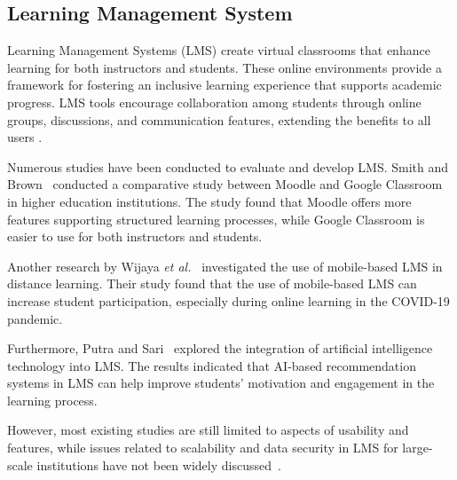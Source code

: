 \subsection{Learning Management System} Learning Management Systems (LMS) create virtual classrooms that enhance learning for both instructors and students.  These online environments provide a framework for fostering an inclusive learning experience that supports academic progress. LMS tools encourage collaboration among students through online groups, discussions, and communication features, extending the benefits to all users \cite{bradley2021learninglms}. 

Numerous studies have been conducted to evaluate and develop LMS. Smith and Brown~\cite{smith2020} conducted a comparative study between Moodle and Google Classroom in higher education institutions. The study found that Moodle offers more features supporting structured learning processes, while Google Classroom is easier to use for both instructors and students.

Another research by Wijaya \textit{et al.}~\cite{wijaya2021} investigated the use of mobile-based LMS in distance learning. Their study found that the use of mobile-based LMS can increase student participation, especially during online learning in the COVID-19 pandemic.

Furthermore, Putra and Sari~\cite{putra2022} explored the integration of artificial intelligence technology into LMS. The results indicated that AI-based recommendation systems in LMS can help improve students' motivation and engagement in the learning process.

However, most existing studies are still limited to aspects of usability and features, while issues related to scalability and data security in LMS for large-scale institutions have not been widely discussed~\cite{kumar2019}.
